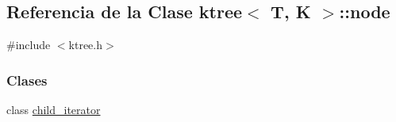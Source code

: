 \hypertarget{classktree_1_1node}{}\subsection{Referencia de la Clase ktree$<$ T, K $>$\+:\+:node}
\label{classktree_1_1node}


{\ttfamily \#include $<$ktree.\+h$>$}

\subsubsection*{Clases}
\begin{DoxyCompactItemize}
\item 
class \hyperlink{classktree_1_1node_1_1child__iterator}{child\+\_\+iterator}
\end{DoxyCompactItemize}
